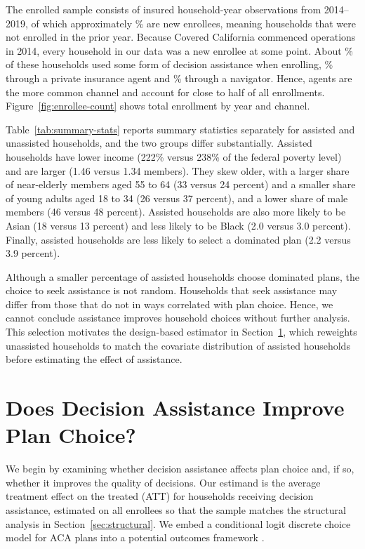 \documentclass[12pt]{article}
\begin{document}
The enrolled sample consists of \nHHins{} insured household-year observations from 2014--2019, of which approximately \pctNewEnrollee\% are new enrollees, meaning households that were not enrolled in the prior year. Because Covered California commenced operations in 2014, every household in our data was a new enrollee at some point.  About \pctAssisted\% of these households used some form of decision assistance when enrolling, \pctBroker\% through a private insurance agent and \pctNavigator\% through a navigator.  Hence, agents are the more common channel and account for close to half of all enrollments. Figure~\ref{fig:enrollee-count} shows total enrollment by year and channel.

Table~\ref{tab:summary-stats} reports summary statistics separately for assisted and unassisted households, and the two groups differ substantially. Assisted households have lower income (222\% versus 238\% of the federal poverty level) and are larger (1.46 versus 1.34 members). They skew older, with a larger share of near-elderly members aged 55 to 64 (33 versus 24 percent) and a smaller share of young adults aged 18 to 34 (26 versus 37 percent), and a lower share of male members (46 versus 48 percent). Assisted households are also more likely to be Asian (18 versus 13 percent) and less likely to be Black (2.0 versus 3.0 percent). Finally, assisted households are less likely to select a dominated plan (2.2 versus 3.9 percent).

Although a smaller percentage of assisted households choose dominated plans, the choice to seek assistance is not random.  Households that seek assistance may differ from those that do not in ways correlated with plan choice. Hence, we cannot conclude assistance improves household choices without further analysis.   This selection motivates the design-based estimator in Section~\ref{sec:causal}, which reweights unassisted households to match the covariate distribution of assisted households before estimating the effect of assistance.


\section{Does Decision Assistance Improve Plan Choice?}
\label{sec:causal}

We begin by examining whether decision assistance affects plan choice and, if so, whether it improves the quality of decisions. Our estimand is the average treatment effect on the treated (ATT) for households receiving decision assistance, estimated on all enrollees so that the sample matches the structural analysis in Section~\ref{sec:structural}. We embed a conditional logit discrete choice model for ACA plans into a potential outcomes framework \citep{rubin1974, imbens2009}.
\end{document}
